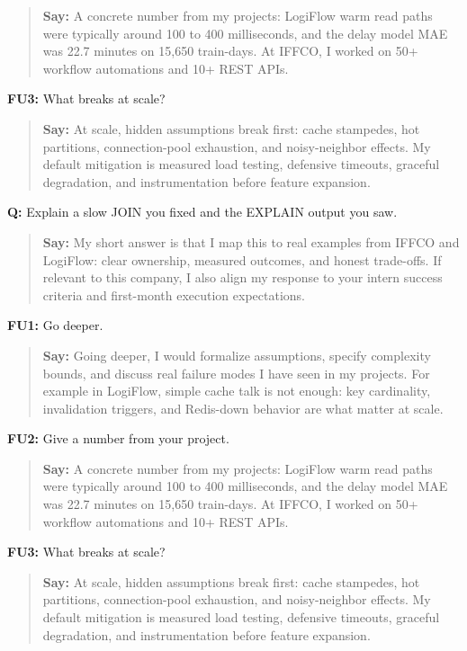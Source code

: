 \documentclass[9pt,a4paper]{article}
\begin{document}
\begin{quote}\small\textbf{Say:} A concrete number from my projects: LogiFlow warm read paths were typically around 100 to 400 milliseconds, and the delay model MAE was 22.7 minutes on 15,650 train-days. At IFFCO, I worked on 50+ workflow automations and 10+ REST APIs.\end{quote}
\vspace{2mm}
\textbf{FU3:} What breaks at scale?

\begin{quote}\small\textbf{Say:} At scale, hidden assumptions break first: cache stampedes, hot partitions, connection-pool exhaustion, and noisy-neighbor effects. My default mitigation is measured load testing, defensive timeouts, graceful degradation, and instrumentation before feature expansion.\end{quote}
\vspace{2mm}
\textbf{Q:} Explain a slow JOIN you fixed and the EXPLAIN output you saw.

\begin{quote}\small\textbf{Say:} My short answer is that I map this to real examples from IFFCO and LogiFlow: clear ownership, measured outcomes, and honest trade-offs. If relevant to this company, I also align my response to your intern success criteria and first-month execution expectations.\end{quote}
\vspace{2mm}
\textbf{FU1:} Go deeper.

\begin{quote}\small\textbf{Say:} Going deeper, I would formalize assumptions, specify complexity bounds, and discuss real failure modes I have seen in my projects. For example in LogiFlow, simple cache talk is not enough: key cardinality, invalidation triggers, and Redis-down behavior are what matter at scale.\end{quote}
\vspace{2mm}
\textbf{FU2:} Give a number from your project.

\begin{quote}\small\textbf{Say:} A concrete number from my projects: LogiFlow warm read paths were typically around 100 to 400 milliseconds, and the delay model MAE was 22.7 minutes on 15,650 train-days. At IFFCO, I worked on 50+ workflow automations and 10+ REST APIs.\end{quote}
\vspace{2mm}
\textbf{FU3:} What breaks at scale?

\begin{quote}\small\textbf{Say:} At scale, hidden assumptions break first: cache stampedes, hot partitions, connection-pool exhaustion, and noisy-neighbor effects. My default mitigation is measured load testing, defensive timeouts, graceful degradation, and instrumentation before feature expansion.\end{quote}
\vspace{2mm}
\end{document}
